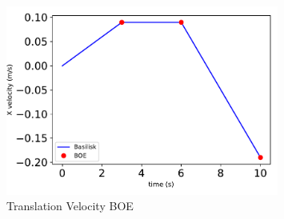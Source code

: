 \begin{figure}[htbp]\centerline{\includegraphics[width=0.8\textwidth]{AutoTeX/scPlusTranslationVelocityBOE}}\caption{Translation Velocity BOE}\label{fig:scPlusTranslationVelocityBOE}\end{figure}